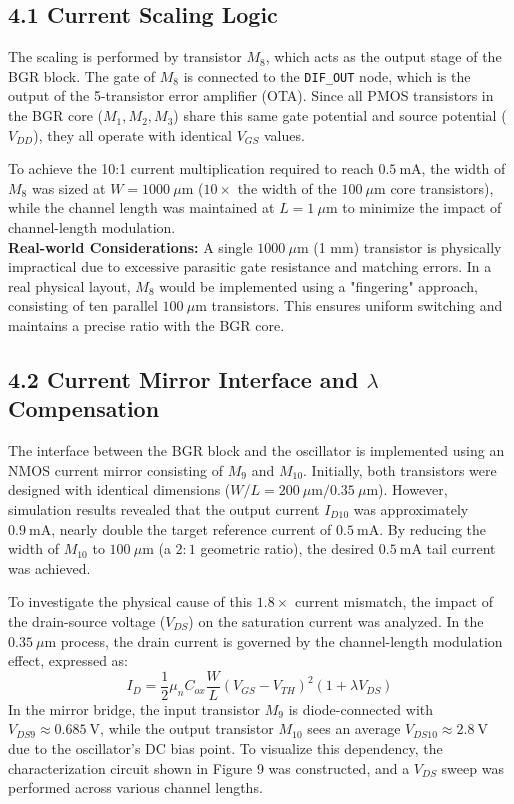 \documentclass[12pt]{article}
\begin{document}
\subsection*{4.1 Current Scaling Logic}
The scaling is performed by transistor $M_8$, which acts as the output stage of the BGR block. The gate of $M_8$ is connected to the \texttt{DIF\_OUT} node, which is the output of the 5-transistor error amplifier (OTA). Since all PMOS transistors in the BGR core ($M_1, M_2, M_3$) share this same gate potential and source potential ($V_{DD}$), they all operate with identical $V_{GS}$ values.

To achieve the 10:1 current multiplication required to reach $0.5~\text{mA}$, the width of $M_8$ was sized at $W = 1000~\mu\text{m}$ ($10\times$ the width of the $100~\mu\text{m}$ core transistors), while the channel length was maintained at $L = 1~\mu\text{m}$ to minimize the impact of channel-length modulation.\\
\newline
\noindent
\textbf{Real-world Considerations:} A single $1000~\mu\text{m}$ (1 mm) transistor is physically impractical due to excessive parasitic gate resistance and matching errors. In a real physical layout, $M_8$ would be implemented using a "fingering" approach, consisting of ten parallel $100~\mu\text{m}$ transistors. This ensures uniform switching and maintains a precise ratio with the BGR core.

\subsection*{4.2 Current Mirror Interface and $\lambda$ Compensation}

The interface between the BGR block and the oscillator is implemented using an NMOS current mirror consisting of $M_9$ and $M_{10}$. Initially, both transistors were designed with identical dimensions ($W/L = 200~\mu\text{m}/0.35~\mu\text{m}$). However, simulation results revealed that the output current $I_{D10}$ was approximately $0.9~\text{mA}$, nearly double the target reference current of $0.5~\text{mA}$. By reducing the width of $M_{10}$ to $100~\mu\text{m}$ (a $2:1$ geometric ratio), the desired $0.5~\text{mA}$ tail current was achieved. 

To investigate the physical cause of this $1.8\times$ current mismatch, the impact of the drain-source voltage ($V_{DS}$) on the saturation current was analyzed. In the $0.35~\mu\text{m}$ process, the drain current is governed by the channel-length modulation effect, expressed as:
\begin{equation}
I_D = \frac{1}{2} \mu_n C_{ox} \frac{W}{L} (V_{GS} - V_{TH})^2 (1 + \lambda V_{DS})
\end{equation}
In the mirror bridge, the input transistor $M_9$ is diode-connected with $V_{DS9} \approx 0.685~\text{V}$, while the output transistor $M_{10}$ sees an average $V_{DS10} \approx 2.8~\text{V}$ due to the oscillator's DC bias point. To visualize this dependency, the characterization circuit shown in Figure 9 was constructed, and a $V_{DS}$ sweep was performed across various channel lengths.
\end{document}
